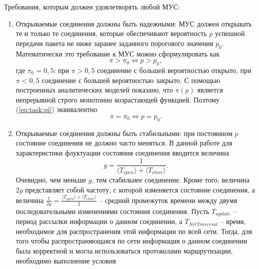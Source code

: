 Требования, которым должен удовлетворять любой МУС:

\begin{enumerate}

    \item  Открываемые соединения должны быть надежными: МУС должен открывать те и только те соединения, которые обеспечивают вероятность $p$ успешной передачи пакета не ниже заранее заданного порогового значения $p_0$. Математически это требование к МУС можно сформулировать как
\begin{equation}
\label{eq:task:pi}
\pi > \pi_0 \Leftrightarrow p>p_0,
\end{equation}
где $\pi_0 = 0,5$: при $\pi > 0,5$ соединение с большей вероятностью открыто, при $\pi < 0,5$ соединение с большей вероятностью закрыто. С помощью построенных аналитических моделей показано, что $\pi(p)$ является непрерывной строго монотонно возрастающей функцией. Поэтому (\ref{eq:task:pi}) эквивалентно
\begin{equation}
 \label{eq:task:pi-eq}
\pi = \pi_0 \Leftrightarrow p=p_0.
\end{equation}
    \item Открываемые соединения должны быть стабильными: при постоянном $p$ состояние соединения не должно часто меняться. В данной работе для характеристики флуктуации состояния соединения вводится величина
\begin{equation}
\label{eq:task:g-def}
g = \frac{1}{ \langle T_{open}\rangle + \langle T_{close}\rangle}.
\end{equation}
Очевидно, чем меньше $g$, тем стабильнее соединение. 
Кроме того, величина $2g$ представляет собой частоту, с которой изменяется состояние соединения, а величина $\frac{1}{2g} = \frac{\langle T_{open}\rangle + \langle T_{close}\rangle}{2}$ -- средний промежуток времени между двумя последовательными изменениями состояния соединения. Пусть $T_{update}$ -- период рассылки информации о данном соединении, а $T_{NetTraversal}$ -- время, необходимое для распространения этой информации по всей сети. Тогда, для того чтобы распространяющаяся по сети информация о данном соединении была корректной и могла использоваться протоколами маршрутизации,  необходимо выполнение условия

\end{enumerate}
